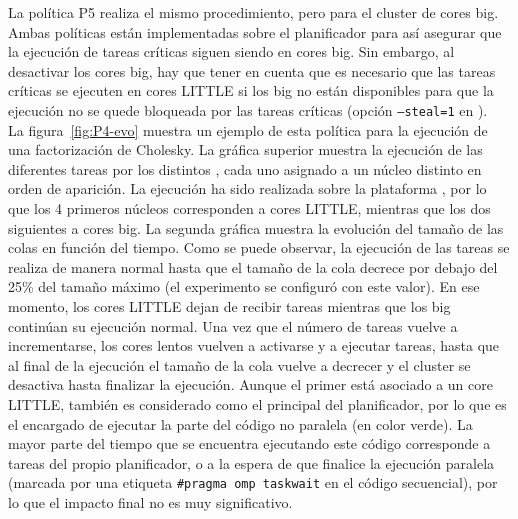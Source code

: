 La política P5 realiza el mismo procedimiento, pero para el cluster de
cores big. Ambas políticas están implementadas sobre el planificador \botlev
para así asegurar que la ejecución de tareas críticas siguen siendo en
cores big. Sin embargo, al desactivar los cores big, hay que tener en cuenta
que es necesario que las tareas críticas se ejecuten en cores LITTLE si los
big no están disponibles para que la ejecución no se quede bloqueada por
las tareas críticas (opción \texttt{--steal=1} en \botlev).\\
La figura~\ref{fig:P4-evo} muestra un ejemplo de esta política para la
ejecución de una factorización de Cholesky. La gráfica superior muestra la
ejecución de las diferentes tareas por los distintos \wts, cada uno
asignado a un núcleo distinto en orden de aparición. La ejecución ha sido
realizada sobre la plataforma \juno, por lo que los 4 primeros núcleos
corresponden a cores LITTLE, mientras que los dos siguientes a cores
big. La segunda gráfica muestra la evolución del tamaño de las colas en
función del tiempo. Como se puede observar, la ejecución de las tareas se
realiza de manera normal hasta que el tamaño de la cola decrece por debajo
del 25\% del tamaño máximo (el experimento se configuró con este valor). En
ese momento, los cores LITTLE dejan de recibir tareas mientras que los big
continúan su ejecución normal. Una vez que el número de tareas vuelve a
incrementarse, los cores lentos vuelven a activarse y a ejecutar tareas,
hasta que al final de la ejecución el tamaño de la cola vuelve a decrecer
y el cluster se desactiva hasta finalizar la ejecución. Aunque el primer
\wt está asociado a un core LITTLE, también es considerado como el \wt
principal del planificador, por lo que es el encargado de ejecutar la parte
del código no paralela (en color verde). La mayor parte del tiempo que se
encuentra ejecutando este código corresponde a tareas del propio
planificador, o a la espera de que finalice la ejecución paralela (marcada
por una etiqueta \texttt{\#pragma omp taskwait} en el código secuencial),
por lo que el impacto final no es muy significativo.



